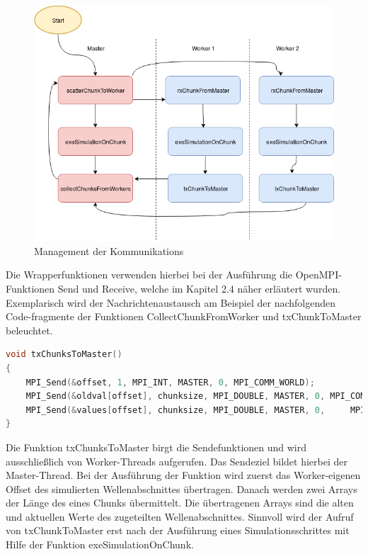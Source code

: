\begin{figure}[H]
	\centering
	\includegraphics[width=1\textwidth]{pictures/MessagePassingManagement.png}
	\caption{Management der Kommunikations}
	\label{fig:ManagementMessages}
\end{figure}

Die Wrapperfunktionen verwenden hierbei bei der Ausführung die OpenMPI-Funktionen Send und Receive, welche im Kapitel 2.4 näher erläutert wurden. Exemplarisch wird der Nachrichtenaustausch am Beispiel der nachfolgenden Code-fragmente der Funktionen CollectChunkFromWorker und txChunkToMaster beleuchtet.

\begin{lstlisting}[language=C]
void txChunksToMaster()
{
	MPI_Send(&offset, 1, MPI_INT, MASTER, 0, MPI_COMM_WORLD);
	MPI_Send(&oldval[offset], chunksize, MPI_DOUBLE, MASTER, 0, MPI_COMM_WORLD);
	MPI_Send(&values[offset], chunksize, MPI_DOUBLE, MASTER, 0, 	MPI_COMM_WORLD);
}
\end{lstlisting}

Die Funktion txChunksToMaster birgt die Sendefunktionen und wird ausschließlich von Worker-Threads aufgerufen. Das Sendeziel bildet hierbei der Master-Thread. Bei der Ausführung der Funktion wird zuerst das Worker-eigenen Offset des simulierten Wellenabschnittes übertragen. Danach werden zwei Arrays der Länge des eines Chunks übermittelt. Die übertragenen Arrays sind die alten und aktuellen Werte des zugeteilten Wellenabschnittes. Sinnvoll wird der Aufruf von txChunkToMaster erst nach der Ausführung eines Simulationsschrittes mit Hilfe der Funktion exeSimulationOnChunk.   

